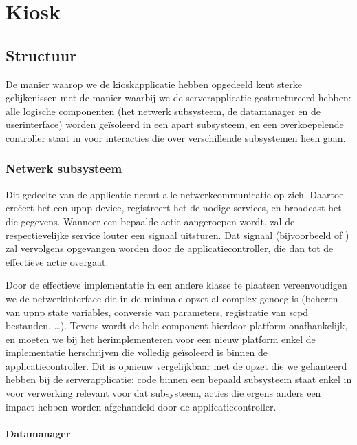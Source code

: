 \part{Kiosk}
\label{kiosk}

\chapter{Structuur}
\label{kiosk:structuur}

De manier waarop we de kioskapplicatie hebben opgedeeld kent sterke gelijkenissen met de manier waarbij we de serverapplicatie gestructureerd hebben: alle logische componenten (het netwerk subsysteem, de datamanager en de userinterface) worden geïsoleerd in een apart subsysteem, en een overkoepelende controller staat in voor interacties die over verschillende subsystemen heen gaan.

\section{Netwerk subsysteem}
\label{kiosk:structuur:netwerk}

Dit gedeelte van de applicatie neemt alle netwerkcommunicatie op zich. Daartoe creëert het een \ac{upnp} device, registreert het de nodige services, en broadcast het die gegevens. Wanneer een bepaalde actie aangeroepen wordt, zal de respectievelijke service louter een signaal uitsturen. Dat signaal (bijvoorbeeld  of ) zal vervolgens opgevangen worden door de applicatiecontroller, die dan tot de effectieve actie overgaat.

Door de effectieve implementatie in een andere klasse te plaatsen vereenvoudigen we de netwerkinterface die in de minimale opzet al complex genoeg is (beheren van \ac{upnp} state variables, conversie van parameters, registratie van \ac{scpd} bestanden, \ldots). Tevens wordt de hele component hierdoor platform-onafhankelijk, en moeten we bij het herimplementeren voor een nieuw platform enkel de implementatie herschrijven die volledig geïsoleerd is binnen de applicatiecontroller. Dit is opnieuw vergelijkbaar met de opzet die we gehanteerd hebben bij de serverapplicatie: code binnen een bepaald subsysteem staat enkel in voor verwerking relevant voor dat subsysteem, acties die ergens anders een impact hebben worden afgehandeld door de applicatiecontroller.

\subsection{Datamanager}
\label{kiosk:structuur:datamanager}

